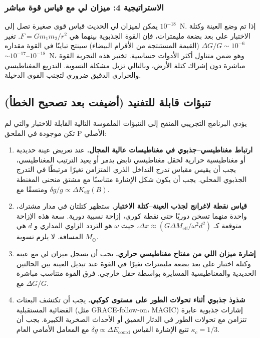 \documentclass[11pt,a4paper]{article}
\begin{document}
	\subsubsection*{الاستراتيجية 4: ميزان لي مع قياس قوة مباشر}
	يمكن لميزان لي الحديث قياس قوى صغيرة تصل إلى $10^{-18}$~N. إذا تم وضع العينة وكتلة الاختبار على بعد بضعة مليمترات، فإن القوة الجذبوية بينهما هي $F = G m_1 m_2 / r^2$. تغير $\Delta G / G \sim 10^{-6}$ (القيمة المستنتجة من الأقزام البيضاء) سينتج تباينًا في القوة مقداره $\sim 10^{-17}$–$10^{-18}$~N، وهو ضمن متناول أكثر الأدوات حساسية. تختبر هذه التجربة القوة مباشرة دون إشراك كتلة الأرض، وبالتالي تزيل مشكلة التسوية. التدريع المغناطيسي والحراري الدقيق ضروري لتجنب القوى الدخيلة.
	
	\subsection{تنبؤات قابلة للتفنيد (أضيفت بعد تصحيح الخطأ)}
	\label{subsec:new-predictions}
	
	يؤدي البرنامج التجريبي المنقح إلى التنبؤات الملموسة التالية القابلة للاختبار والتي لم تكن موجودة في الملحق P الأصلي:
	
	\begin{enumerate}
		\item \textbf{ارتباط مغناطيسي–جذبوي في مغناطيسات عالية المجال.} عند تعريض عينة حديدية أو مغناطيسية حرارية لحقل مغناطيسي نابض يدمر أو يعيد الترتيب المغناطيسي، يجب أن يقيس مقياس تدرج التداخل الذري المتزامن تغيرًا مرتبطًا في التدرج الجذبوي المحلي. يجب أن يكون شكل الإشارة متناسبًا مع مشتق منحنى المغنطة ومتسقًا مع $\delta g/g \propto \Delta K_{\mathrm{eff}}(B)$.
		\item \textbf{قياس نقطة لاغرانج لجذب العينة–كتلة الاختبار.} ستظهر كتلتان في مدار مشترك، واحدة منهما تسخن دوريًا حتى نقطة كوري، إزاحة نسبية دورية. سعة هذه الإزاحة متوقعة كـ $\Delta x \approx (G \Delta M_{\mathrm{eff}} / \omega^2 d^2)$، حيث $\omega$ هو التردد الزاوي المداري و $d$ هي المسافة. لا يلزم تسوية $M_\oplus$.
		\item \textbf{إشارة ميزان اللي من مفتاح مغناطيسي حراري.} يجب أن يسجل ميزان لي مع عينة وكتلة اختبار على بعد بضعة مليمترات تغيرًا في القوة عند تبديل العينة بين الحالتين الحديدية والمغناطيسية المسايرة بواسطة حقل خارجي. فرق القوة متناسب مباشرة مع $\Delta G/G$.
		\item \textbf{شذوذ جذبوي أثناء تحولات الطور على مستوى كوكبي.} يجب أن تكتشف البعثات الفضائية المستقبلية (مثل GRACE‑follow‑on، MAGIC) إشارات جذبوية عابرة تتزامن مع تحولات الطور في الدثار العميق أو الأحداث الصخرية الكبيرة. يجب أن تتبع الإشارة القياس $\delta g \propto \Delta E_{\mathrm{coord}}$ مع المعامل الأمامي العام $\kappa_c = 1/3$.
	\end{enumerate}
	
\end{document}
